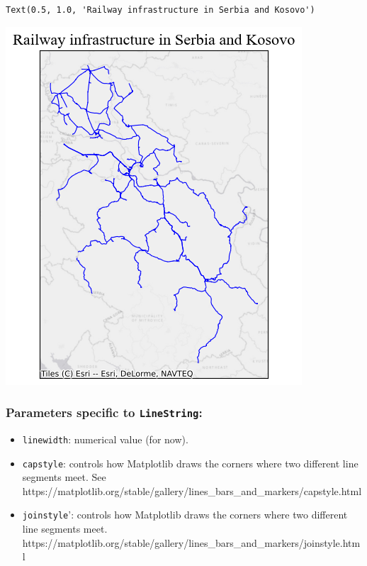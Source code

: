 \documentclass[
  letterpaper,
  DIV=11,
  numbers=noendperiod]{scrreprt}
\providecommand{\tightlist}{%
  \setlength{\itemsep}{0pt}\setlength{\parskip}{0pt}}\usepackage{longtable,booktabs,array}
\begin{document}
\begin{verbatim}
Text(0.5, 1.0, 'Railway infrastructure in Serbia and Kosovo')
\end{verbatim}

\includegraphics{labs/w02_maps_files/figure-pdf/cell-13-output-2.png}

\subsubsection{\texorpdfstring{Parameters specific to
\texttt{LineString}:}{Parameters specific to LineString:}}\label{parameters-specific-to-linestring}

\begin{itemize}
\tightlist
\item
  \texttt{linewidth}: numerical value (for now).
\item
  \texttt{capstyle}: controls how Matplotlib draws the corners where two
  different line segments meet. See
  https://matplotlib.org/stable/gallery/lines\_bars\_and\_markers/capstyle.html
\item
  \texttt{joinstyle}': controls how Matplotlib draws the corners where
  two different line segments meet.
  https://matplotlib.org/stable/gallery/lines\_bars\_and\_markers/joinstyle.html
\end{itemize}
\end{document}
